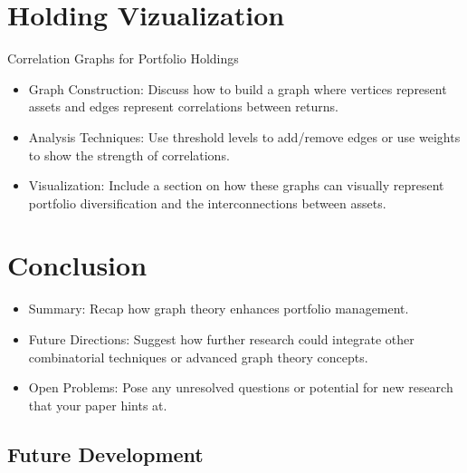 \documentclass{article}
\begin{document}
\section{Holding Vizualization}

Correlation Graphs for Portfolio Holdings

\begin{itemize}
    \item Graph Construction: Discuss how to build a graph where vertices represent assets and edges represent correlations between returns.
    \item Analysis Techniques: Use threshold levels to add/remove edges or use weights to show the strength of correlations.
    \item Visualization: Include a section on how these graphs can visually represent portfolio diversification and the interconnections between assets.
\end{itemize}


\section{Conclusion}

\begin{itemize}
    \item Summary: Recap how graph theory enhances portfolio management.
    \item Future Directions: Suggest how further research could integrate other combinatorial techniques or advanced graph theory concepts.
    \item Open Problems: Pose any unresolved questions or potential for new research that your paper hints at.
\end{itemize}


\subsection{Future Development}
\end{document}
